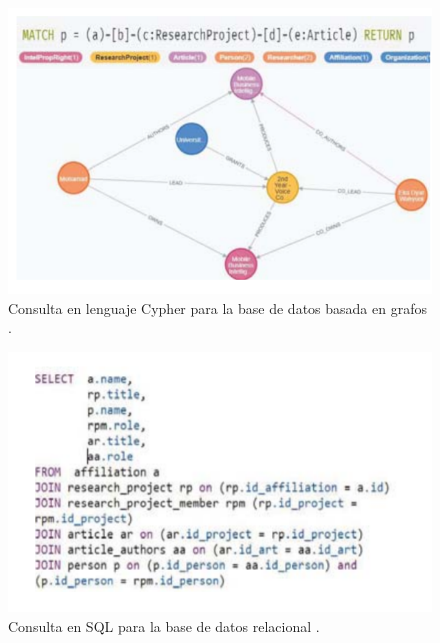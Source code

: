 \begin{figure}[H]
    \centering
    \includegraphics[scale=0.6]{Graficos/caso1.png}
    \caption{Consulta en lenguaje Cypher para la base de datos basada en grafos \cite{afandi2020university}.}
    \label{fig:cypher}
\end{figure}
\begin{figure}[H]
    \centering
    \includegraphics[scale=0.7]{Graficos/caso1_1.png}
    \caption{Consulta en SQL para la base de datos relacional \cite{afandi2020university}.}
    \label{fig:sql}
\end{figure}